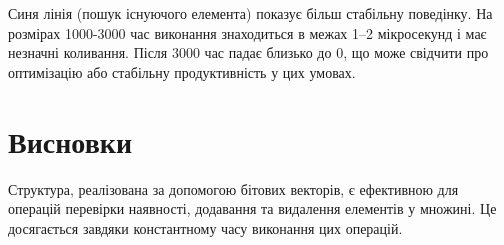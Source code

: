 \documentclass[a4paper,12pt]{article}
\begin{document}
Синя лінія (пошук існуючого елемента) показує більш стабільну поведінку. На розмірах 1000-3000 час виконання знаходиться в межах 1–2 мікросекунд і має незначні коливання. Після 3000 час падає близько до 0, що може свідчити про оптимізацію або стабільну продуктивність у цих умовах.

\section{Висновки}
Структура, реалізована за допомогою бітових векторів, є ефективною для операцій перевірки наявності, додавання та видалення елементів у множині. Це досягається завдяки константному часу виконання цих операцій.
\end{document}
